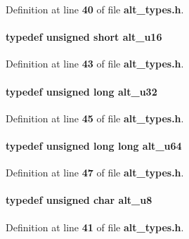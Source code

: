 Definition at line {\bf 40} of file {\bf alt\+\_\+types.\+h}.

\paragraph[{alt\+\_\+u16}]{\setlength{\rightskip}{0pt plus 5cm}typedef unsigned short {\bf alt\+\_\+u16}}\label{alt__types_8h_a120929a5c349971f36315dc1fcd19b1e}


Definition at line {\bf 43} of file {\bf alt\+\_\+types.\+h}.

\paragraph[{alt\+\_\+u32}]{\setlength{\rightskip}{0pt plus 5cm}typedef unsigned long {\bf alt\+\_\+u32}}\label{alt__types_8h_acd6a6a2004f05f01beaa42367510d8af}


Definition at line {\bf 45} of file {\bf alt\+\_\+types.\+h}.

\paragraph[{alt\+\_\+u64}]{\setlength{\rightskip}{0pt plus 5cm}typedef unsigned long long {\bf alt\+\_\+u64}}\label{alt__types_8h_aac49dd8e52198a7559865eec91152a72}


Definition at line {\bf 47} of file {\bf alt\+\_\+types.\+h}.

\paragraph[{alt\+\_\+u8}]{\setlength{\rightskip}{0pt plus 5cm}typedef unsigned char {\bf alt\+\_\+u8}}\label{alt__types_8h_a760207c0ebacdf5df403cdacd6365a6a}


Definition at line {\bf 41} of file {\bf alt\+\_\+types.\+h}.


